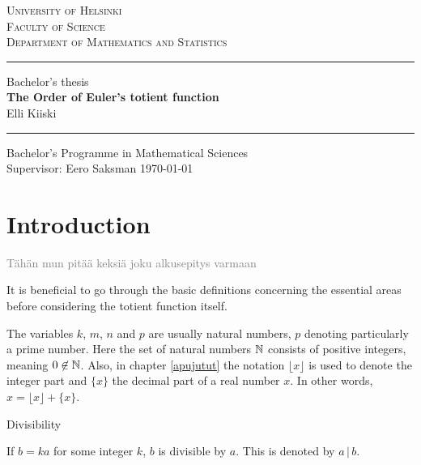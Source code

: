 \documentclass{article}
\begin{document}
\begin{titlepage}
\setlength{\parindent}{0mm}
\Large
\textsc{University of Helsinki \\
Faculty of Science\\
Department of Mathematics and Statistics}
\vspace{5mm}
\hrule height2pt

\begin{center}
\vfill
\Large Bachelor's thesis  \\
\vspace{3mm}
\huge 
\textbf{The Order of Euler's totient function}\\
\vspace{3mm}
\Large Elli Kiiski
\vfill
\end{center}

\hrule height2pt
\vspace{5mm}
Bachelor's Programme in Mathematical Sciences \\[2mm]
Supervisor: Eero Saksman
\hfill
\today
\end{titlepage}

\tableofcontents
\thispagestyle{empty}
\clearpage

\section{Introduction}

\textcolor{gray}{Tähän mun pitää keksiä joku alkusepitys varmaan}

It is beneficial to go through the basic definitions concerning the essential areas before considering the totient function itself.

The variables $k$, $m$, $n$ and $p$ are usually natural numbers, $p$ denoting particularly a prime number. Here the set of natural numbers $\mathbb{N}$ consists of positive integers, meaning $0 \not\in \mathbb{N}$. Also, in chapter \ref{apujutut} the notation $\lfloor x\rfloor$ is used to denote the integer part and $\{x\}$ the decimal part of a real number $x$. In other words, $x=\lfloor x\rfloor+\{x\}$.

\begin{definition}
Divisibility

If $b=ka$ for some integer $k$, $b$ is divisible by $a$. This is denoted by $a \,\vert\, b$.

\end{definition}
\end{document}
